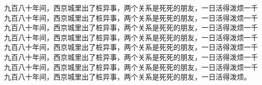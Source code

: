 九百八十年间，西京城里出了桩异事，两个关系是死死的朋友，一日活得泼烦一千九百八十年间，西京城里出了桩异事，两个关系是死死的朋友，一日活得泼烦一千九百八十年间，西京城里出了桩异事，两个关系是死死的朋友，一日活得泼烦一千九百八十年间，西京城里出了桩异事，两个关系是死死的朋友，一日活得泼烦一千九百八十年间，西京城里出了桩异事，两个关系是死死的朋友，一日活得泼烦一千九百八十年间，西京城里出了桩异事，两个关系是死死的朋友，一日活得泼烦一千九百八十年间，西京城里出了桩异事，两个关系是死死的朋友，一日活得泼烦一千九百八十年间，西京城里出了桩异事，两个关系是死死的朋友，一日活得泼烦。